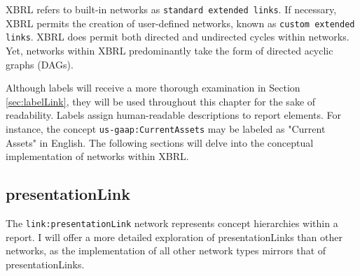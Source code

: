 XBRL refers to built-in networks as \texttt{standard extended links}.
If necessary, XBRL permits the creation of user-defined networks, known as \texttt{custom extended links}\cite{xbrl21_terminology}.
XBRL does permit both directed and undirected cycles within networks.
Yet, networks within XBRL predominantly take the form of directed acyclic graphs (DAGs).

Although labels will receive a more thorough examination in Section \ref{sec:labelLink}, they will be used throughout this chapter for the sake of readability.
Labels assign human-readable descriptions to report elements.
For instance, the concept \texttt{us-gaap:CurrentAssets} may be labeled as "Current Assets" in English.
The following sections will delve into the conceptual implementation of networks within XBRL.


\subsection{presentationLink}



The \texttt{link:presentationLink} network represents concept hierarchies within a report.
I will offer a more detailed exploration of presentationLinks than other networks,
as the implementation of all other network types mirrors that of presentationLinks.

